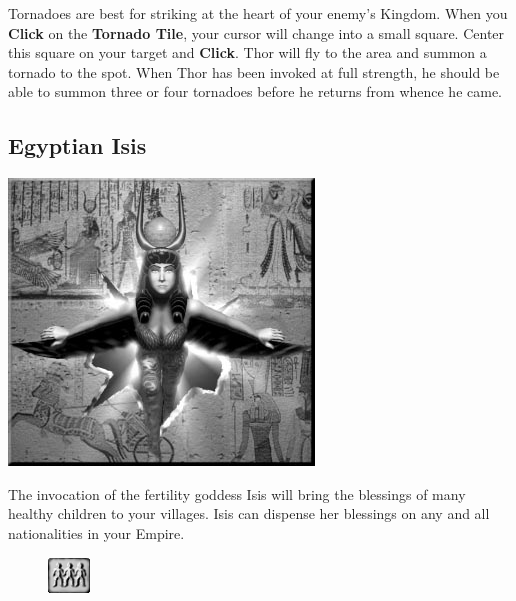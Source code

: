 Tornadoes are best for striking at the heart of your enemy’s Kingdom. When you \textbf{Click} on the \textbf{Tornado Tile}, your cursor will change into a small square. Center this square on your target and \textbf{Click}. Thor will fly to the area and summon a tornado to the spot. When Thor has been invoked at full strength, he should be able to summon three or four tornadoes before he returns from whence he came.

\clearpage

\subsection{Egyptian Isis}

\begin{center}
	\includegraphics[width=1\linewidth]{Aisis}
\end{center}

The invocation of the fertility goddess Isis will bring the blessings of many healthy children to your villages. Isis can dispense her blessings on any and all nationalities in your Empire.

\begin{figure}
	\vspace{-20pt}
	\begin{center}
		\includegraphics[width=0.1\textwidth]{Tfertility}
	\end{center}
	\vspace{-20pt}
\end{figure}

